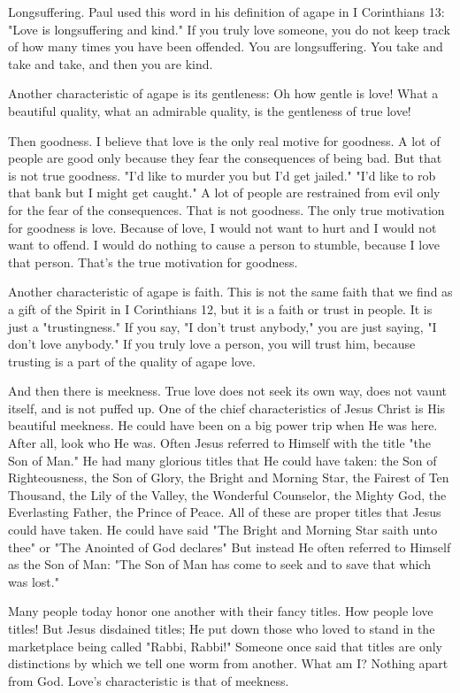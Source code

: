 Longsuffering. Paul used this word in his definition of agape in I Corinthians 13: "Love is longsuffering and kind." If you truly love someone, you do not keep track of how many times you have been offended. You are longsuffering. You take and take and take, and then you are kind. 

Another characteristic of agape is its gentleness: Oh how gentle is love! What a beautiful quality, what an admirable quality, is the gentleness of true love! 

Then goodness. I believe that love is the only real motive for goodness. A lot of people are good only because they fear the consequences of being bad. But that is not true goodness. "I'd like to murder you but I'd get jailed." "I'd like to rob that bank but I might get caught." A lot of people are restrained from evil only for the fear of the consequences. That is not goodness. The only true motivation for goodness is love. Because of love, I would not want to hurt and I would not want to offend. I would do nothing to cause a person to stumble, because I love that person. That's the true motivation for goodness. 

Another characteristic of agape is faith. This is not the same faith that we find as a gift of the Spirit in I Corinthians 12, but it is a faith or trust in people. It is just a "trustingness." If you say, "I don't trust anybody," you are just saying, "I don't love anybody." If you truly love a person, you will trust him, because trusting is a part of the quality of agape love. 

And then there is meekness. True love does not seek its own way, does not vaunt itself, and is not puffed up. One of the chief characteristics of Jesus Christ is His beautiful meekness. He could have been on a big power trip when He was here. After all, look who He was. Often Jesus referred to Himself with the title "the Son of Man." He had many glorious titles that He could have taken: the Son of Righteousness, the Son of Glory, the Bright and Morning Star, the Fairest of Ten Thousand, the Lily of the Valley, the Wonderful Counselor, the Mighty God, the Everlasting Father, the Prince of Peace. All of these are proper titles that Jesus could have taken. He could have said "The Bright and Morning Star saith unto thee" or "The Anointed of God declares" But instead He often referred to Himself as the Son of Man: "The Son of Man has come to seek and to save that which was lost." 

Many people today honor one another with their fancy titles. How people love titles! But Jesus disdained titles; He put down those who loved to stand in the marketplace being called "Rabbi, Rabbi!" Someone once said that titles are only distinctions by which we tell one worm from another. What am I? Nothing apart from God. Love's characteristic is that of meekness. 

